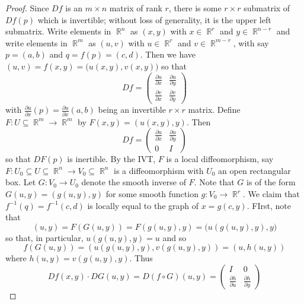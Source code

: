 \documentclass[11pt, a4paper]{memoir}
\DeclareMathOperator{\R}{{\mathbb{R}}}
\theoremstyle{change}
\theoremstyle{plain}
\theoremstyle{nonumberplain}
\newtheorem{proof}{Proof}
\newcommand{\prt}[2]{\ensuremath{\frac{\partial #1}{\partial #2}}}
\numberwithin{equation}{section}
\begin{document}
\begin{proof}
    Since $Df$ is an $m\times n$ matrix of rank $r$, there is some $r\times r$ submatrix of $Df(p)$ which is invertible; without loss of generality, it is the upper left submatrix.
    Write elements in $\R^n$ as $(x,y)$ with $x\in\R^r$ and $y\in \R^{n-r}$ and write elements in $\R^m$ as $(u,v)$ with $u\in\R^r$ and $v\in\R^{m-r}$, with say $p=(a,b)$ and $q=f(p)=(c,d)$.
    Then we have $(u,v)=f(x,y)=\bigl(u(x,y),v(x,y)\bigr)$ so that
    \begin{equation*}
        Df =
        \begin{pmatrix}
            \prt{u}{x} & \prt{u}{y}\\
            \prt{v}{x} & \prt{v}{y}
        \end{pmatrix}
    \end{equation*}
    with $\prt{u}{x}(p)=\prt{u}{x}(a,b)$ being an invertible $r\times r$ matrix.
    Define $F:U\subseteq\R^m\to\R^m$ by $F(x,y)=(u(x,y),y)$.
    Then
    \begin{equation*}
        Df=\begin{pmatrix}
            \prt{u}{x} & \prt{u}{y}\\
            0 & I
        \end{pmatrix}
    \end{equation*}
    so that $DF(p)$ is inertible.
    By the IVT, $F$ is a local diffeomorphism, say $F:U_0\subseteq U\subseteq\R^n\to V_0\subseteq\R^n$ is a diffeomorphism with $U_0$ an open rectangular box.
    Let $G:V_0\to U_0$ denote the smooth inverse of $F$.
    Note that $G$ is of the form $G(u,y)=(g(u,y),y)$ for some smooth function $g:V_0\to\R^r$.
    We claim that $f^{-1}(q)=f^{-1}(c,d)$ is locally equal to the graph of $x=g(c,y)$.
    FIrst, note that
    \begin{equation*}
        (u,y)=F(G(u,y))=F(g(u,y),y)=\bigl(u(g(u,y),y),y\bigr)
    \end{equation*}
    so that, in particular, $u(g(u,y),y)=u$ and so
    \begin{equation*}
        f(G(u,y))=(u(g(u,y),y),v(g(u,y),y))=(u,h(u,y))
    \end{equation*}
    where $h(u,y)=v(g(u,y),y)$.
    Thus
    \begin{equation*}
        Df(x,y)\cdot DG(u,y)=D(f\circ G)(u,y)=
        \begin{pmatrix}
            I & 0\\
            \prt{h}{u} & \prt{h}{y}
        \end{pmatrix}

\end{equation*}
\end{proof}
\end{document}
